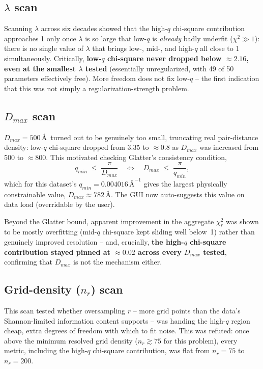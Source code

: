 \documentclass[11pt,a4paper]{article}
\begin{document}
\subsection{$\lambda$ scan}

Scanning $\lambda$ across six decades showed that the high-$q$
chi-square contribution approaches 1 only once $\lambda$ is so large
that low-$q$ is \emph{already} badly underfit ($\chi^2 \gg 1$): there
is no single value of $\lambda$ that brings low-, mid-, and high-$q$
all close to 1 simultaneously. Critically, \textbf{low-$q$ chi-square
never dropped below $\approx 2.16$, even at the smallest $\lambda$
tested} (essentially unregularized, with 49 of 50 parameters
effectively free). More freedom does not fix low-$q$ -- the first
indication that this was not simply a regularization-strength
problem.

\subsection{$D_{max}$ scan}

$D_{max} = 500$\,\AA\ turned out to be genuinely too small, truncating
real pair-distance density: low-$q$ chi-square dropped from 3.35 to
$\approx 0.8$ as $D_{max}$ was increased from 500 to $\approx 800$.
This motivated checking Glatter's consistency condition,
\begin{equation}
  q_{min} \;\le\; \frac{\pi}{D_{max}}
  \quad\Longleftrightarrow\quad
  D_{max} \;\le\; \frac{\pi}{q_{min}} ,
  \label{eq:glatter}
\end{equation}
which for this dataset's $q_{min} = 0.004016\,\text{\AA}^{-1}$ gives
the largest physically constrainable value, $D_{max} \approx 782$\,\AA.
The GUI now auto-suggests this value on data load (overridable by the
user).

Beyond the Glatter bound, apparent improvement in the aggregate
$\chi^2_r$ was shown to be mostly overfitting (mid-$q$ chi-square kept
sliding well below~1) rather than genuinely improved resolution --
and, crucially, \textbf{the high-$q$ chi-square contribution stayed
pinned at $\approx 0.02$ across every $D_{max}$ tested}, confirming
that $D_{max}$ is not the mechanism either.

\subsection{Grid-density ($n_r$) scan}

This scan tested whether oversampling $r$ -- more grid points than the
data's Shannon-limited information content supports -- was handing the
high-$q$ region cheap, extra degrees of freedom with which to fit
noise. This was refuted: once above the minimum resolved grid density
($n_r \gtrsim 75$ for this problem), every metric, including the
high-$q$ chi-square contribution, was flat from $n_r = 75$ to
$n_r = 200$.
\end{document}
